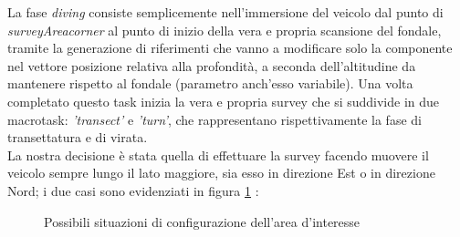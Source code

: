 \documentclass{article}
\begin{document}
                
                La fase \emph{diving} consiste semplicemente nell'immersione del veicolo dal punto di \emph{surveyAreacorner} al punto di inizio della vera e propria 
                scansione del fondale, tramite la generazione di riferimenti che vanno a modificare solo la componente nel vettore posizione relativa alla
                profondità, a seconda dell'altitudine da mantenere rispetto al fondale (parametro anch'esso variabile). Una volta completato questo task
                inizia la vera e propria survey che si suddivide in due macrotask:
                 \emph{'transect'} e \emph{'turn'}, che rappresentano rispettivamente la fase di transettatura e di virata.\\
                La nostra decisione è stata quella di effettuare la survey facendo muovere il veicolo sempre lungo il lato maggiore, sia esso in direzione 
                Est o in direzione Nord; i due casi sono evidenziati in figura \ref{fig:lati} :

                \begin{figure} [ht]
                    \caption{Possibili situazioni di configurazione dell'area d'interesse}
                    \label{fig:lati}
                \end{figure}
\end{document}
